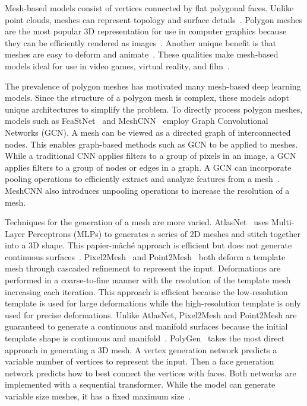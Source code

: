 Mesh-based models consist of vertices connected by flat polygonal faces. Unlike point clouds, meshes can represent topology and surface details~\cite{Xiao2020}. Polygon meshes are the most popular 3D representation for use in computer graphics because they can be efficiently rendered as images~\cite{Watt1996}. Another unique benefit is that meshes are easy to deform and animate~\cite{Wang2018}. These qualities make mesh-based models ideal for use in video games, virtual reality, and film~\cite{Nash2020}.

The prevalence of polygon meshes has motivated many mesh-based deep learning models. Since the structure of a polygon mesh is complex, these models adopt unique architectures to simplify the problem. To directly process polygon meshes, models such as FeaStNet~\cite{Verma2018} and MeshCNN~\cite{Hanocka2019} employ Graph Convolutional Networks (GCN). A mesh can be viewed as a directed graph of interconnected nodes. This enables graph-based methods such as GCN to be applied to meshes. While a traditional CNN applies filters to a group of pixels in an image, a GCN applies filters to a group of nodes or edges in a graph. A GCN can incorporate pooling operations to efficiently extract and analyze features from a mesh~\cite{Verma2018}. MeshCNN also introduces unpooling operations to increase the resolution of a mesh.

Techniques for the generation of a mesh are more varied. AtlasNet~\cite{Groueix2018} uses Multi-Layer Perceptrons (MLPs) to generates a series of 2D meshes and stitch together into a 3D shape. This papier-m\^{a}ch\'{e} approach is efficient but does not generate continuous surfaces~\cite{Groueix2018}. Pixel2Mesh~\cite{Wang2018} and Point2Mesh~\cite{Hanocka2020} both deform a template mesh through cascaded refinement to represent the input. Deformations are performed in a coarse-to-fine manner with the resolution of the template mesh increasing each iteration. This approach is efficient because the low-resolution template is used for large deformations while the high-resolution template is only used for precise deformations. Unlike AtlasNet, Pixel2Mesh and Point2Mesh are guaranteed to generate a continuous and manifold surfaces because the initial template shape is continuous and manifold~\cite{Wang2018, Hanocka2020}. PolyGen~\cite{Nash2020} takes the most direct approach in generating a 3D mesh. A vertex generation network predicts a variable number of vertices to represent the input. Then a face generation network predicts how to best connect the vertices with faces. Both networks are implemented with a sequential transformer. While the model can generate variable size meshes, it has a fixed maximum size~\cite{Nash2020}.


